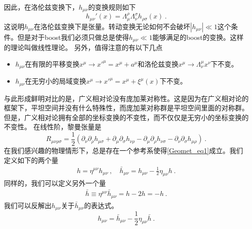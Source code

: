 因此，在洛伦兹变换下，$h_{\mu\nu}$的变换规则如下
\begin{equation}
h_{\mu\nu}'(x) = \Lambda^\rho_\mu\Lambda^\sigma_\nu h_{\rho\sigma} (x) ~. 
\end{equation}
这说明$h_{\mu\nu}$在洛伦兹变换下是张量。转动变换无论如何不会破坏$|h_{\mu\nu}|\ll 1$这个条件。但是对于boost我们必须只做总是使得$h_{\mu\nu}\ll 1$能够满足的boost的变换。这样的理论叫做线性理论。
另外，值得注意的有以下几点
\begin{itemize}
\item $h_{\mu\nu}$在有限的平移变换$x^\mu\rightarrow x'^\mu = x^\mu + a^\mu$和洛伦兹变换$x^\mu\rightarrow \Lambda^\mu_\nu x^\nu$下不变。
\item $h_{\mu\nu}$在无穷小的局域变换$x^\mu \rightarrow x'^\mu = x^\mu + \xi^\mu (x)$下不变。
\end{itemize}
与此形成鲜明对比的是，广义相对论没有庞加莱对称性。这是因为在广义相对论的框架下，平坦空间并没有什么特殊性，而庞加莱对称群是平坦空间里面的对称群。但是，广义相对论拥有全部的坐标变换的不变性，而不仅仅是无穷小的坐标变换的不变性。
在线性阶，黎曼张量是
\begin{equation}
R_{\mu\nu\rho\sigma} = \frac{1}{2}  (\partial_\nu\partial_\rho h_{\mu\sigma} + \partial_\mu\partial_\sigma h_{\nu\rho} - \partial_\mu\partial_\rho h_{\nu\sigma} - \partial_\nu\partial_\sigma h_{\mu\rho}  ) ~.
\end{equation} 
在我们感兴趣的物理情形下，总是存在一个参考系使得\autoref{Geomet_eq1}成立。我们定义如下的两个量 
\begin{align}
h = \eta^{\mu\nu} h_{\mu\nu} ~, \quad \bar h_{\mu\nu} = h_{\mu\nu} - \frac{1}{2} \eta_{\mu\nu} h~.
\end{align}
同样的，我们可以定义另外一个量
\begin{align}
\bar h \equiv \eta^{\mu\nu} \bar h_{\mu\nu} = h - 2 h = -h~.
\end{align}
我们可以反解出$h_{\mu\nu}$关于$\bar h_{\mu\nu}$的表达式。
\begin{equation}
h_{\mu\nu} = \bar h_{\mu\nu} - \frac{1}{2} \eta_{\mu\nu} \bar h ~. 
\end{equation}








